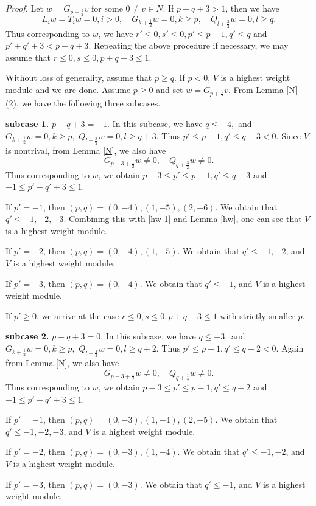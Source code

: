 \documentclass[12pt]{article}
\numberwithin{equation}{section}
\begin{document}
{\it Proof.}  Let $w=G_{p+\frac{1}{2}}v$ for some $0\ne v\in N$. If $p+q+3>1$, then we have
\begin{equation}\label{hw-1}L_iw=T_iw=0,i>0,\quad  G_{k+\frac{1}{2}}w=0,k\ge p,\quad  Q_{l+\frac{3}{2}}w=0, l\ge q.
\end{equation}
Thus corresponding to  $w$, we have $r'\le 0, s'\le 0, p'\le p-1, q'\le q$ and $p'+q'+3<p+q+3$. Repeating the above procedure if necessary, we may assume that  $r\le 0, s\le 0, p+q+3\le 1.$

Without  loss of generality, assume that $p\ge q$. If $p<0$, $V$ is a highest weight module and we are done.  Assume  $p\ge 0$ and  set $w=G_{p+\frac{1}{2}}v$.  From Lemma \ref{N} (2),  we have the following three subcases.

{\bf subcase 1.} $p+q+3=-1$. In this subcase, we have $q\le -4,$  and  $G_{k+\frac{1}{2}}w=0, k\ge p,$ $ Q_{l+\frac{3}{2}}w=0, l\ge q+3.$ Thus $p'\le p-1,q'\le q+3<0$. Since $V$ is nontrival, from Lemma \ref{N}, we also have
$$G_{p-3+\frac{1}{2}}w\ne 0, \quad Q_{q+\frac{3}{2}}w\ne 0.$$
Thus  corresponding to  $w$, we obtain $p-3\le p'\le p-1, q'\le q+3$ and $-1\le p'+q'+3\le 1.$

If $p'=-1$, then $(p,q)=(0,-4),(1,-5),(2,-6)$. We obtain that $q'\le -1,-2,-3$. Combining this with \eqref{hw-1} and Lemma \ref{hw}, one can  see that $V$ is a highest weight module.

If $p'=-2$, then $(p,q)=(0,-4),(1,-5)$. We obtain that $q'\le -1,-2$, and $V$ is a highest weight module.

If $p'=-3$, then $(p,q)=(0,-4)$. We obtain that $q'\le -1$, and $V$ is a highest weight module.

If $p'\ge 0$,  we arrive at the case $r\le 0,s\le 0, p+q+3\le 1$ with strictly smaller $p$.

{\bf subcase 2.} $p+q+3=0$. In this subcase, we have $q\le -3,$  and $G_{k+\frac{1}{2}}w=0, k\ge p,$ $Q_{l+\frac{3}{2}}w=0, l\ge q+2.$ Thus $p'\le p-1,q'\le q+2<0$. Again from Lemma \ref{N}, we also have
$$G_{p-3+\frac{1}{2}}w\ne 0, \quad Q_{q+\frac{1}{2}}w\ne 0.$$
Thus corresponding to $w$, we obtain $p-3\le p'\le p-1, q'\le q+2$ and $-1\le p'+q'+3\le 1.$

If $p'=-1$, then $(p,q)=(0,-3),(1,-4),(2,-5)$. We obtain that $q'\le -1,-2,-3$, and $V$ is a highest weight module.

If $p'=-2$, then $(p,q)=(0,-3),(1,-4)$. We obtain that $q'\le -1,-2$, and $V$ is a highest weight module.

If $p'=-3$, then $(p,q)=(0,-3)$. We obtain that $q'\le -1$, and $V$ is a highest weight module.
\end{document}
